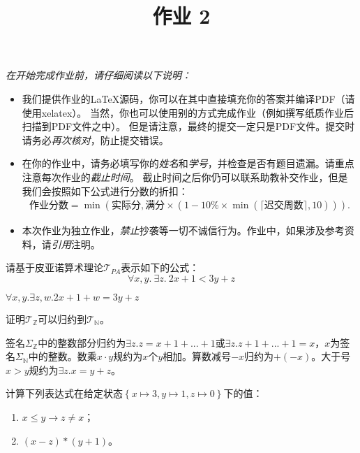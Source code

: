 \documentclass[11pt,a4paper]{article}
\title{作业 2}
\begin{document}
\maketitle

\textit{在开始完成作业前，请仔细阅读以下说明：}
\begin{itemize}
    \item 我们提供作业的\LaTeX 源码，你可以在其中直接填充你的答案并编译PDF（请使用xelatex）。
    当然，你也可以使用别的方式完成作业（例如撰写纸质作业后扫描到PDF文件之中）。
    但是请注意，最终的提交一定只是PDF文件。提交时请务必\emph{再次核对}，防止提交错误。
    \item 在你的作业中，请务必填写你的\emph{姓名}和\emph{学号}，并检查是否有题目遗漏。请重点注意每次作业的\emph{截止时间}。
    截止时间之后你仍可以联系助教补交作业，但是我们会按照如下公式进行分数的折扣：
    \begin{align*}
        \text{作业分数} = \min\left(\text{实际分}, \text{满分}\times\left(1 - 10\%\times\min\left(\lceil\text{迟交周数}\rceil, 10\right)\right)\right).
    \end{align*}
    \item 本次作业为独立作业，\emph{禁止}抄袭等一切不诚信行为。作业中，如果涉及参考资料，请\emph{引用}注明。
\end{itemize}



\subproblem 请基于皮亚诺算术理论$\mathcal{T}_{PA}$表示如下的公式：
$$\forall x, y.\ \exists z.\ 2x + 1 < 3y + z$$
\begin{solution}
    $\forall x,y.\exists z,w.2x+1+w=3y+z$
\end{solution}

\subproblem 证明$\mathcal{T}_{\mathbb{Z}}$可以归约到$\mathcal{T}_{\mathbb{N}}$。
\begin{solution}
    签名$\Sigma_{\mathbb{Z}}$中的整数部分归约为$\exists z.z=x+1+...+1$或$\exists z.z+1+...+1=x$，$x$为签名$\Sigma_{\mathbb{N}}$中的整数。数乘$x\cdot y$规约为$x$个$y$相加。算数减号$-x$归约为$+(-x)$。大于号$x>y$规约为$\exists z.x=y+z$。
\end{solution}

\newpage
{}
\subproblem 计算下列表达式在给定状态$\left\{x\mapsto 3, y\mapsto 1, z\mapsto 0\right\}$下的值：
\begin{enumerate}
    \item $x \le y \rightarrow z \neq x$；
    \item $(x-z)*(y+1)$。
\end{enumerate}
\end{document}

